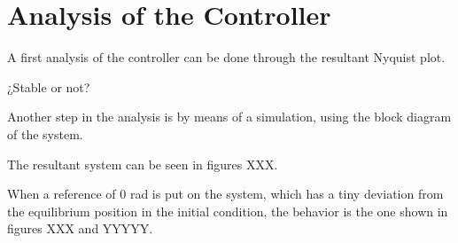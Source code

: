 \section{Analysis of the Controller}\label{analysisController}
A first analysis of the controller can be done through the resultant Nyquist plot.


¿Stable or not?

Another step in the analysis is by means of a simulation, using the block diagram of the system.

The resultant system can be seen in figures XXX.


When a reference of 0 rad is put on the system, which has a tiny deviation from the equilibrium position in the initial condition, the behavior is the one shown in figures XXX and YYYYY. 

